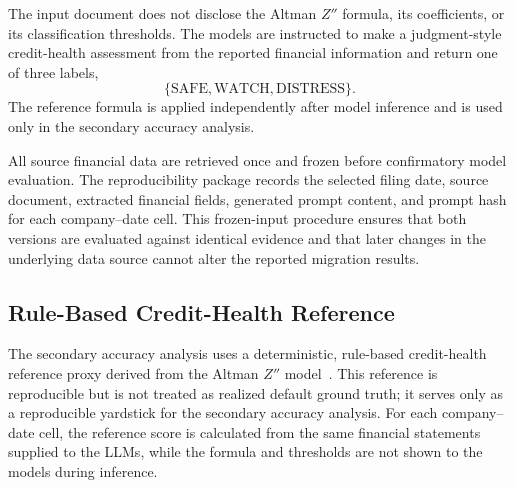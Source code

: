 \documentclass[11pt]{article}
\begin{document}
The input document does not disclose the Altman $Z''$ formula, its coefficients, or its classification thresholds. The models are instructed to make a judgment-style credit-health assessment from the reported financial information and return one of three labels,
\begin{equation}
\{\text{SAFE},\text{WATCH},\text{DISTRESS}\}.
\end{equation}
The reference formula is applied independently after model inference and is used only in the secondary accuracy analysis.

All source financial data are retrieved once and frozen before confirmatory model evaluation. The reproducibility package records the selected filing date, source document, extracted financial fields, generated prompt content, and prompt hash for each company--date cell. This frozen-input procedure ensures that both versions are evaluated against identical evidence and that later changes in the underlying data source cannot alter the reported migration results.

\subsection{Rule-Based Credit-Health Reference}
The secondary accuracy analysis uses a deterministic, rule-based credit-health reference proxy derived from the Altman $Z''$ model~\cite{altman_em}. This reference is reproducible but is not treated as realized default ground truth; it serves only as a reproducible yardstick for the secondary accuracy analysis. For each company--date cell, the reference score is calculated from the same financial statements supplied to the LLMs, while the formula and thresholds are not shown to the models during inference.
\end{document}
